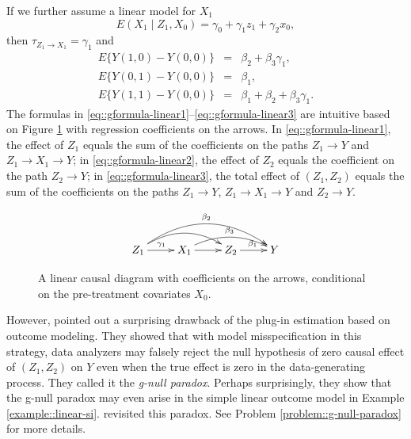 \begin{example}
If we further assume a linear model for $X_1$
$$
E(X_1\mid Z_1, X_0) = \gamma_0 + \gamma_1 z_1 + \gamma_2 x_0,
$$
then $\tau_{Z_1\rightarrow X_1} = \gamma_1$ and  
\begin{eqnarray} 
E\{ Y(1,0)  - Y(0,0)\} &=& \beta_2 +  \beta_3 \gamma_1,  \label{eq::gformula-linear1}\\
E\{ Y(0,1)  - Y(0,0)\} &=& \beta_1, \label{eq::gformula-linear2}\\
E\{ Y(1,1)  - Y(0,0)\} &=& \beta_1 +  \beta_2 + \beta_3 \gamma_1. \label{eq::gformula-linear3} 
\end{eqnarray}
The formulas in \eqref{eq::gformula-linear1}--\eqref{eq::gformula-linear3} are intuitive based on Figure \ref{fig::si-simple-coefficients} with regression coefficients on the arrows. In \eqref{eq::gformula-linear1}, the effect of $Z_1$ equals the sum of the coefficients on the paths $Z_1\rightarrow Y$ and $Z_1\rightarrow X_1\rightarrow Y$; in \eqref{eq::gformula-linear2}, the effect of $Z_2$ equals the coefficient on the path $Z_2\rightarrow Y$; in \eqref{eq::gformula-linear3}, the total effect of $(Z_1,Z_2)$ equals the sum of the coefficients  on the paths $Z_1\rightarrow Y$, $Z_1\rightarrow X_1\rightarrow Y$ and $Z_2\rightarrow Y$. 
\end{example}


\begin{figure}[t]
\bigskip 
$$
 \xymatrix{
 Z_1 \ar[r]^{\gamma_1}   \ar@/^1.3pc/[rr]  \ar@/^2.0pc/[rrr]^{\beta_2} & X_1  \ar@/^1pc/[rr]^{\beta_3}  \ar[r] & Z_2  \ar[r]^{\beta_1} & Y
 }
 $$
 \caption{A linear causal diagram with coefficients on the arrows, conditional on the pre-treatment covariates $X_0$.}\label{fig::si-simple-coefficients}
\end{figure}
 
 
 


However, \citet{robinswasserman1997estimation} pointed out a surprising drawback of the plug-in estimation based on outcome modeling. They showed that with model misspecification in this strategy, data analyzers may falsely reject the null hypothesis of zero causal effect of $(Z_1,Z_2)$ on $Y$ even when the true effect is zero in the data-generating process. They called it the {\it g-null paradox}. Perhaps surprisingly, they show that the g-null paradox may even arise in the simple linear outcome model in Example \ref{example::linear-si}.  \citet{mcgrath2021revisiting} revisited this paradox. See Problem \ref{problem::g-null-paradox} for more details. 

